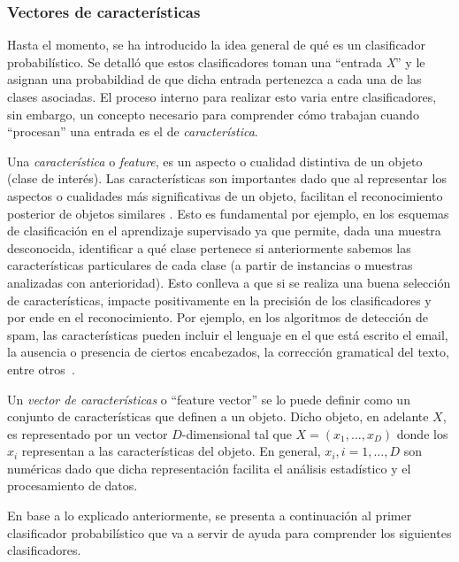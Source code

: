 \subsubsection{Vectores de características} \label{subsection:feature}
	
	Hasta el momento, se ha introducido la idea general de qué es un clasificador probabilístico. Se detalló que estos clasificadores toman una ``entrada \textit{X}'' y le asignan una probabildiad de que dicha entrada pertenezca a cada una de las clases asociadas. El proceso interno para realizar esto varia entre clasificadores, sin embargo, un concepto necesario para comprender cómo trabajan cuando ``procesan'' una entrada es el de \textit{característica}.

	Una \textit{característica} o \textit{feature}, es un aspecto o cualidad distintiva de un objeto (clase de interés). Las características son importantes dado que al representar los aspectos o cualidades más significativas de un objeto, facilitan el reconocimiento posterior de objetos similares \cite{OIVIND95}. Esto es fundamental por ejemplo, en los esquemas de clasificación en el aprendizaje supervisado ya que permite, dada una muestra desconocida, identificar a qué clase pertenece si anteriormente sabemos las características particulares de cada clase (a partir de instancias o muestras analizadas con anterioridad). Esto conlleva a que si se realiza una buena selección de características, impacte positivamente en la precisión de los clasificadores y por ende en el reconocimiento. Por ejemplo, en los algoritmos de detección de spam, las características pueden incluir el lenguaje en el que está escrito el email, la ausencia o presencia de ciertos encabezados, la corrección gramatical del texto, entre otros~\cite{SpamPaper}.

	Un \textit{vector de características} o ``feature vector'' se lo puede definir como un conjunto de características que definen a un objeto. Dicho objeto, en adelante $X$, es representado por un vector $D$-dimensional tal que  $X=(x_1,\dots,x_D)$ donde los $x_i$ representan a las características del objeto. En general, $x_i, i=1,\dots,D$ son numéricas dado que dicha representación facilita el análisis estadístico y el procesamiento de datos.

	En base a lo explicado anteriormente, se presenta a continuación al primer clasificador probabilístico que va a servir de ayuda para comprender los siguientes clasificadores.
		
	
